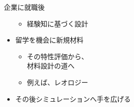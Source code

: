 \documentclass[12pt, dvipdfmx]{beamer}
\begin{document}
\begin{frame}
\begin{columns}[T, onlytextwidth]
\begin{exampleblock}{企業に就職後}
\begin{itemize}
\begin{itemize}
                            \item 経験知に基づく設計
                        \end{itemize}
                        \item 留学を機会に新規材料
                        \begin{itemize}
                            \item その特性評価から、\\材料設計の道へ
                            \item 例えば、レオロジー
                        \end{itemize}
                        \item その後シミュレーションへ手を広げる
                    \end{itemize}
                \end{exampleblock}
        \end{columns}
\end{frame}
\end{document}
